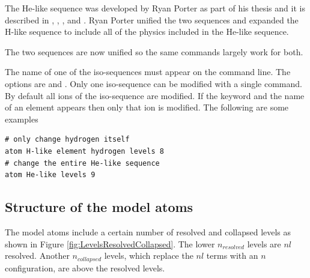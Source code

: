 The He-like sequence was developed by Ryan Porter as part
of his thesis and it is described in \citet{Bauman2005},
\citet{Porter2005},  \citet{PorterFerland2007}, and
\citet{Porter.R12Improved-He-I-emissivities-in-the-case-B-approximation}.
Ryan Porter unified the two sequences
and expanded the H-like sequence to include all of the physics included
in the He-like sequence.

The two sequences are now unified so the same
 commands largely work
for both.

The name of one of the iso-sequences must appear on the command line.  
The options are  and .
Only one iso-sequence can be modified
with a single command.
By default all ions of the iso-sequence are modified.
If the keyword  and
the name of an element appears then
only that ion is modified.  
The following are some examples

\begin{verbatim}
# only change hydrogen itself
atom H-like element hydrogen levels 8
# change the entire He-like sequence
atom He-like levels 9
\end{verbatim}

\subsection{Structure of the model atoms}

The model atoms include a certain number of resolved and collapsed levels
as shown in Figure \ref{fig:LevelsResolvedCollapsed}.
The lower $n_{resolved}$ levels are $nl$ resolved.
Another $n_{collapsed}$ levels,
which replace the $nl$ terms with an $n$ configuration,
are above the resolved levels.

